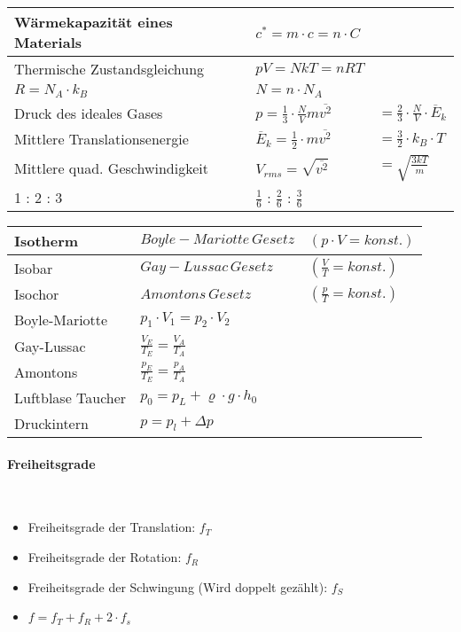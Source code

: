 \begin{tabularx}{\columnwidth}{@{}XXX@{}}
	Wärmekapazität eines Materials & $c^{*} = m \cdot c = n \cdot C$ \\ \hline
	Thermische Zustandsgleichung & $pV = NkT = nRT$ \\ \hline
	$R = N_A \cdot k_B $ & $N = n \cdot N_A$ \\ \hline
	Druck des ideales Gases & $p = \frac{1}{3}\cdot\frac{N}{V}m\overline{v^2}$ & $= \frac{2}{3}\cdot\frac{N}{V}\cdot\overline{E}_k$ \\ \hline
	Mittlere Translationsenergie & $\overline{E}_k = \frac{1}{2}\cdot m \overline{v^2}$ & $= \frac{3}{2}\cdot k_B \cdot T$ \\ \hline
	Mittlere quad. Geschwindigkeit & $V_{rms} = \sqrt{\overline{v^2}}$ & $= \sqrt{\frac{3kT}{m}}$ \\ \hline
	1 : 2 : 3 & $\frac{1}{6}$ : $\frac{2}{6}$ : $\frac{3}{6}$ \\ \hline
\end{tabularx}

\noindent
\begin{tabularx}{\columnwidth}{@{}XXX@{}}
	Isotherm & $Boyle-Mariotte\,Gesetz$ & $(p\cdot V = konst.)$ \\ \hline
	Isobar & $Gay-Lussac\,Gesetz$ & $(\frac{V}{T} = konst.)$ \\ \hline
	Isochor & $Amontons\,Gesetz$ & $(\frac{p}{T} = konst.)$ \\ \hline
	Boyle-Mariotte & $p_1\cdot V_1 = p_2\cdot V_2$ \\ \hline
	Gay-Lussac & $\frac{V_E}{T_E} = \frac{V_A}{T_A}$ \\ \hline
	Amontons & $\frac{p_E}{T_E} = \frac{p_A}{T_A}$ \\ \hline
	Luftblase Taucher & $p_0 = p_L + \varrho \cdot  g \cdot h_0$ \\ \hline
	Druckintern & $p = p_l + \Delta p$ \\ \hline 
\end{tabularx}
\vspace{1mm}

\paragraph{Freiheitsgrade}\mbox{}\\
\noindent
\begin{itemize}
	\item Freiheitsgrade der Translation: $f_T$
	\item Freiheitsgrade der Rotation: $f_R$
	\item Freiheitsgrade der Schwingung (Wird doppelt gezählt): $f_S$
	\item $f = f_T + f_R + 2\cdot f_s$
\end{itemize}

